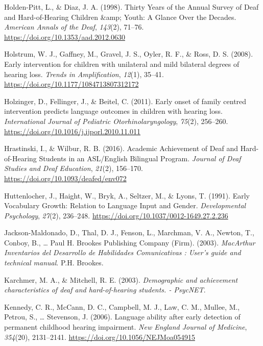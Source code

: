 \documentclass[english,man]{apa6}
\begin{document}
\leavevmode\hypertarget{ref-holden-pitt1998}{}%
Holden-Pitt, L., \& Diaz, J. A. (1998). Thirty Years of the Annual Survey of Deaf and Hard-of-Hearing Children \&amp; Youth: A Glance Over the Decades. \emph{American Annals of the Deaf}, \emph{143}(2), 71--76. \url{https://doi.org/10.1353/aad.2012.0630}

\leavevmode\hypertarget{ref-holstrum2008}{}%
Holstrum, W. J., Gaffney, M., Gravel, J. S., Oyler, R. F., \& Ross, D. S. (2008). Early intervention for children with unilateral and mild bilateral degrees of hearing loss. \emph{Trends in Amplification}, \emph{12}(1), 35--41. \url{https://doi.org/10.1177/1084713807312172}

\leavevmode\hypertarget{ref-holzinger2011}{}%
Holzinger, D., Fellinger, J., \& Beitel, C. (2011). Early onset of family centred intervention predicts language outcomes in children with hearing loss. \emph{International Journal of Pediatric Otorhinolaryngology}, \emph{75}(2), 256--260. \url{https://doi.org/10.1016/j.ijporl.2010.11.011}

\leavevmode\hypertarget{ref-hrastinski2016}{}%
Hrastinski, I., \& Wilbur, R. B. (2016). Academic Achievement of Deaf and Hard-of-Hearing Students in an ASL/English Bilingual Program. \emph{Journal of Deaf Studies and Deaf Education}, \emph{21}(2), 156--170. \url{https://doi.org/10.1093/deafed/env072}

\leavevmode\hypertarget{ref-huttenlocher1991}{}%
Huttenlocher, J., Haight, W., Bryk, A., Seltzer, M., \& Lyons, T. (1991). Early Vocabulary Growth: Relation to Language Input and Gender. \emph{Developmental Psychology}, \emph{27}(2), 236--248. \url{https://doi.org/10.1037/0012-1649.27.2.236}

\leavevmode\hypertarget{ref-jackson-maldonado2003}{}%
Jackson-Maldonado, D., Thal, D. J., Fenson, L., Marchman, V. A., Newton, T., Conboy, B., \ldots{} Paul H. Brookes Publishing Company (Firm). (2003). \emph{MacArthur Inventarios del Desarrollo de Habilidades Comunicativas : User's guide and technical manual}. P.H. Brookes.

\leavevmode\hypertarget{ref-karchmer2003}{}%
Karchmer, M. A., \& Mitchell, R. E. (2003). \emph{Demographic and achievement characteristics of deaf and hard-of-hearing students. - PsycNET}.

\leavevmode\hypertarget{ref-kennedy2006}{}%
Kennedy, C. R., McCann, D. C., Campbell, M. J., Law, C. M., Mullee, M., Petrou, S., \ldots{} Stevenson, J. (2006). Language ability after early detection of permanent childhood hearing impairment. \emph{New England Journal of Medicine}, \emph{354}(20), 2131--2141. \url{https://doi.org/10.1056/NEJMoa054915}
\end{document}
